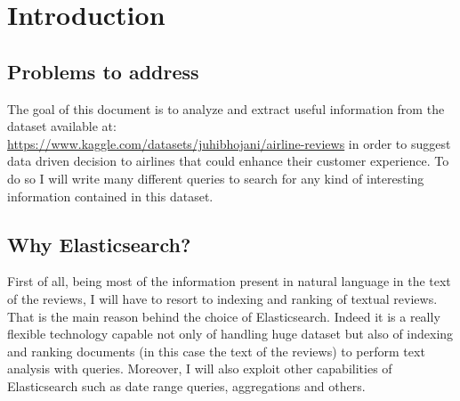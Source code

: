 \documentclass{Configuration_Files/PoliMi3i_thesis}
\begin{document}
\mainmatter %

\chapter{Introduction}
\section{Problems to address}
The goal of this document is to analyze and extract useful information from the dataset available at:
\\
\href{https://www.kaggle.com/datasets/juhibhojani/airline-reviews}{https://www.kaggle.com/datasets/juhibhojani/airline-reviews}
in order to suggest data driven decision to airlines that could enhance their customer experience. To do so I will write many different queries to search for any kind of interesting information contained in this dataset. 

\section {Why Elasticsearch?}

First of all, being most of the information present in natural language in the text of the reviews, I will have to resort to indexing and ranking of textual reviews. That is the main reason behind the choice of Elasticsearch. Indeed it is a really flexible technology capable not only of handling huge dataset but also of indexing and ranking documents (in this case the text of the reviews) to perform text analysis with queries. Moreover, I will also exploit other capabilities of Elasticsearch such as date range queries, aggregations and others.

\end{document}
